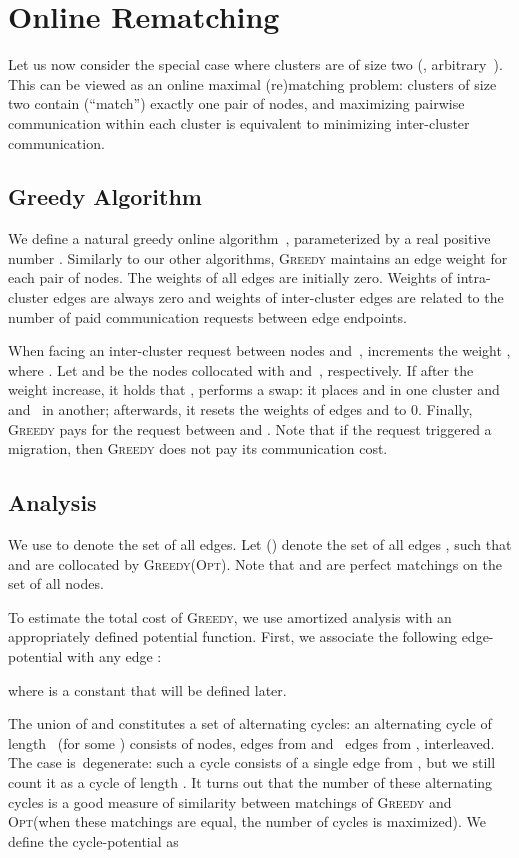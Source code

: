 \documentclass{siamart190516}
\newcommand{\GREEDY}{\textsc{Greedy}\xspace}
\newcommand{\OPT}{\textsc{Opt}\xspace}
\begin{document}
\section{Online Rematching}
\label{sec:k-two}

Let us now consider the special case where clusters are of size two (,
arbitrary~). This can be viewed as an online maximal (re)matching problem:
clusters of size two contain (``match'') exactly one pair of nodes, and
maximizing pairwise communication within each cluster is equivalent to
minimizing inter-cluster communication. 


\subsection{Greedy Algorithm}

We define a natural greedy online algorithm~, parameterized by a real
positive number . Similarly to our other algorithms,
\GREEDY  maintains an edge weight for each pair of nodes. 
The weights of all edges are initially zero. Weights of intra-cluster edges
are always zero and weights of inter-cluster edges are related to the number
of paid communication requests between edge endpoints. 

When facing an inter-cluster request between nodes 
and~,  increments the weight , where . Let 
and  be the nodes collocated with  and~, respectively. If after the
weight increase, it holds that ,  performs a swap: it places  and  in one
cluster and  and~ in another; afterwards, it resets the weights of
edges  and  to 0. Finally, \GREEDY pays for the request
between  and . Note that if the request triggered a migration, then
\GREEDY does not pay its communication cost.


\subsection{Analysis}

We use  to denote the set of all edges.
Let  () denote the set of all edges , such 
that  and  are collocated by \GREEDY (\OPT). 
Note that  and  are perfect matchings on the set of all nodes.

To estimate the total cost of \GREEDY, we use amortized analysis with 
an appropriately defined potential function. First, 
we associate the following edge-potential with any edge :

where  is a constant that will be defined later. 

The union of  and  constitutes a set of alternating cycles:
an alternating cycle of length~ (for some ) consists of 
nodes,  edges from  and ~edges from , interleaved. The
case  is~degenerate: such a cycle consists of a single edge from , but we still count it as a cycle of length . 
It turns out that the number of these alternating cycles is a good measure of 
similarity between matchings of \GREEDY and \OPT (when these matchings are 
equal, the number of cycles is maximized). We define the
cycle-potential as
\end{document}
